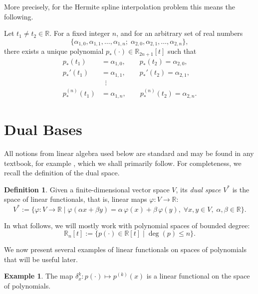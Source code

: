 \documentclass{article}
\theoremstyle{definition}
\newtheorem{example}[theorem]{Example}
\theoremstyle{definition}
\newtheorem{definition}{Definition}
\numberwithin{figure}{section}
\newcommand{\1}{\mathbf{1}}
\begin{document}
More precisely, for the Hermite spline interpolation problem this means the following.

Let $t_1 \neq t_2 \in \mathbb{R}$. For a fixed integer $n$, and for an arbitrary set of real numbers
\[
    \{\alpha_{1,0}, \alpha_{1,1}, \ldots, \alpha_{1,n};\; \alpha_{2,0}, \alpha_{2,1}, \ldots, \alpha_{2,n}\},
\]
there exists a unique polynomial $p_*(\cdot) \in \mathbb{R}_{2n+1}[t]$ such that
\begin{align*}
    p_*(t_1) &= \alpha_{1,0},\qquad p_*(t_2) = \alpha_{2,0},\\
    p_*'(t_1) &= \alpha_{1,1},\qquad p_*'(t_2) = \alpha_{2,1},\\
    &\;\;\vdots\\
    p_*^{(n)}(t_1) &= \alpha_{1,n},\qquad p_*^{(n)}(t_2) = \alpha_{2,n}.
\end{align*}

\section{Dual Bases}\label{sec-dualbasis}

All notions from linear algebra used below are standard and may be found in any textbook, for example \cite{Vinberg2003}, which we shall primarily follow. For completeness, we recall the definition of the dual space.

\begin{definition}
Given a finite-dimensional vector space $V$, its \emph{dual space} $V^*$ is the space of linear functionals, that is, linear maps $\varphi: V \to \mathbb{R}$:
\begin{equation}
    V^* := \{\varphi: V \to \mathbb{R} \mid
    \varphi(\alpha x + \beta y) = \alpha\,\varphi(x) + \beta\,\varphi(y),\;
    \forall x,y \in V,\; \alpha,\beta \in \mathbb{R}\}.
\end{equation}
\end{definition}

In what follows, we will mostly work with polynomial spaces of bounded degree:
\[
    \mathbb{R}_n[t] := \{p(\cdot) \in \mathbb{R}[t] \mid \deg(p) \le n\}.
\]

We now present several examples of linear functionals on spaces of polynomials that will be useful later.

\begin{example}\label{ex-delta}
The map $\delta_x^k : p(\cdot) \mapsto p^{(k)}(x)$ is a linear functional on the space of polynomials.
\end{example}
\end{document}
